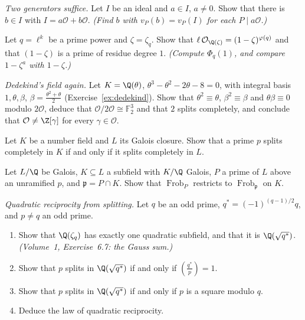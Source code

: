 \begin{exercise}[$\star\star$]\label{ex:twogen}
\emph{Two generators suffice.} Let $I$ be an ideal and $a\in I$, $a\ne0$. Show that there is $b\in I$ with $I=a\mathcal
O+b\mathcal O$. \emph{(Find $b$ with $v_P(b)=v_P(I)$ for each $P\mid a\mathcal O$.)}
\end{exercise}

\begin{exercise}[$\star\star$]\label{ex:totram}
Let $q=\ell^k$ be a prime power and $\zeta=\zeta_q$. Show that $\ell\,\mathcal O_{\Q(\zeta)}=(1-\zeta)^{\varphi(q)}$ and
that $(1-\zeta)$ is a prime of residue degree $1$. \emph{(Compute $\Phi_q(1)$, and compare $1-\zeta^a$ with $1-\zeta$.)}
\end{exercise}

\begin{exercise}[$\star\star$]\label{ex:dedekindfield}
\emph{Dedekind's field again.} Let $K=\Q(\theta)$, $\theta^3-\theta^2-2\theta-8=0$, with integral basis $1,\theta,\beta$,
$\beta=\frac{\theta^2+\theta}2$ (Exercise~\ref{ex:dedekind}). Show that $\theta^2\equiv\theta$, $\beta^2\equiv\beta$ and
$\theta\beta\equiv0$ modulo $2\mathcal O$, deduce that $\mathcal O/2\mathcal O\cong\mathbb F_2^3$ and that $2$ splits
completely, and conclude that $\mathcal O\ne\Z[\gamma]$ for every $\gamma\in\mathcal O$.
\end{exercise}

\begin{exercise}[$\star\star$]\label{ex:closure}
Let $K$ be a number field and $L$ its Galois closure. Show that a prime $p$ splits completely in $K$ if and only if it
splits completely in $L$.
\end{exercise}

\begin{exercise}[$\star\star$]\label{ex:frobsub}
Let $L/\Q$ be Galois, $K\subseteq L$ a subfield with $K/\Q$ Galois, $P$ a prime of $L$ above an unramified $p$, and
$\mathfrak p=P\cap K$. Show that $\operatorname{Frob}_P$ restricts to $\operatorname{Frob}_{\mathfrak p}$ on $K$.
\end{exercise}

\begin{exercise}[$\star\star\star$]\label{ex:qrsplit}
\emph{Quadratic reciprocity from splitting.} Let $q$ be an odd prime, $q^*=(-1)^{(q-1)/2}q$, and $p\ne q$ an odd prime.
\begin{enumerate}[label=(\alph*)]
\item Show that $\Q(\zeta_q)$ has exactly one quadratic subfield, and that it is $\Q(\sqrt{q^*})$. \emph{(Volume~1,
Exercise~6.7: the Gauss sum.)}
\item Show that $p$ splits in $\Q(\sqrt{q^*})$ if and only if $\left(\frac{q^*}p\right)=1$.
\item Show that $p$ splits in $\Q(\sqrt{q^*})$ if and only if $p$ is a square modulo $q$.
\item Deduce the law of quadratic reciprocity.
\end{enumerate}
\end{exercise}

